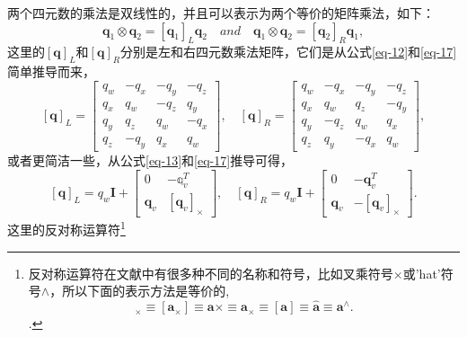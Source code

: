 \documentclass[10pt, a4paper]{article}
\begin{document}
  两个四元数的乘法是双线性的，并且可以表示为两个等价的矩阵乘法，如下：
  \begin{equation} \label{eq-17}
    \mathbf{q}_1 \otimes \mathbf{q}_2 = [\mathbf{q}_1]_L \mathbf{q}_2 \quad and \quad
    \mathbf{q}_1 \otimes \mathbf{q}_2 = [\mathbf{q}_2]_R \mathbf{q}_1 ,
  \end{equation}
  这里的$[\mathbf{q}]_L$和$[\mathbf{q}]_R$分别是左和右四元数乘法矩阵，它们是从公式\eqref{eq-12}和\eqref{eq-17}简单推导而来，
  \begin{equation} \label{eq-18}
    [\mathbf{q}]_L =
    \begin{bmatrix}
      q_w & -q_x & -q_y & -q_z \\
      q_x &  q_w & -q_z &  q_y \\
      q_y &  q_z &  q_w & -q_x \\
      q_z & -q_y &  q_x &  q_w
    \end{bmatrix} , \quad
    [\mathbf{q}]_R =
    \begin{bmatrix}
      q_w & -q_x & -q_y & -q_z \\
      q_x &  q_w &  q_z & -q_y \\
      q_y & -q_z &  q_w &  q_x \\
      q_z &  q_y & -q_x &  q_w
    \end{bmatrix} ,
  \end{equation}
  或者更简洁一些，从公式\eqref{eq-13}和\eqref{eq-17}推导可得，
  \begin{equation} \label{eq-19}
    [\mathbf{q}]_L = q_w \mathbf{I} +
    \begin{bmatrix}
      0 & -\mathbb{q}_v^T \\
      \mathbf{q}_v & [\mathbf{q}_v]_\times
    \end{bmatrix}, \quad
    [\mathbf{q}]_R = q_w \mathbf{I} +
    \begin{bmatrix}
      0 & -\mathbf{q}_v^T \\
      \mathbf{q}_v & -[\mathbf{q}_v]_\times
    \end{bmatrix} .
  \end{equation}
  这里的反对称运算符\footnote{反对称运算符在文献中有很多种不同的名称和符号，比如叉乘符号$\times$或'hat'符号$\wedge$，所以下面的表示方法是等价的, \\
  \begin{equation*}
    [\mathbf{a}]_\times \equiv [\mathbf{a}_\times] \equiv \mathbf{a} \times \equiv \mathbf{a}_\times \equiv
    [\mathbf{a}] \equiv \hat{\mathbf{a}} \equiv \mathbf{a}^{\wedge}.
  \end{equation*}. }
\end{document}
